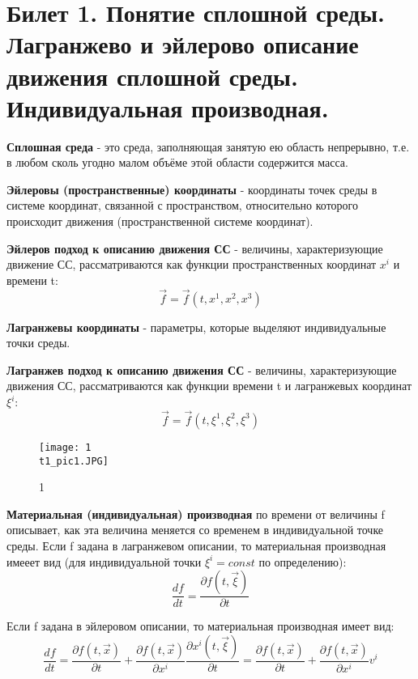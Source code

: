 \newpage
\section{Билет 1. Понятие сплошной среды. Лагранжево и эйлерово описание движения сплошной среды. Индивидуальная производная.}

\textbf{Сплошная среда} - это среда, заполняющая занятую ею область непрерывно, т.е. в любом сколь угодно малом объёме этой области содержится масса.

\textbf{Эйлеровы (пространственные) координаты} - координаты точек среды в системе координат, связанной с пространством, относительно которого происходит движения (пространственной системе координат).

\textbf{Эйлеров подход к описанию движения СС} - величины, характеризующие движение СС, рассматриваются как функции пространственных координат $x^i$ и времени t: $$\vec{f} = \vec{f}(t, x^1, x^2, x^3)$$

\textbf{Лагранжевы координаты} - параметры, которые выделяют индивидуальные точки среды.

\textbf{Лагранжев подход к описанию движения СС} - величины, характеризующие движения СС, рассматриваются как функции времени t и лагранжевых координат $\xi^i$: $$\vec{f} = \vec{f}(t, \xi^1, \xi^2, \xi^3)$$
\begin{figure}{}
\texttt{[image: 1\\t1\_pic1.JPG]}
\caption{\label{ris:image2}1}
\end{figure}

\textbf{Материальная (индивидуальная) производная} по времени от величины f описывает, как эта величина меняется со временем в индивидуальной точке среды. Если f задана в лагранжевом описании, то материальная производная имееет вид (для индивидуальной точки $\xi^i = const $ по определению): $$\frac{df}{dt} = \frac{\partial f(t,\vec{\xi})}{\partial t}$$

Если f задана в эйлеровом описании, то материальная производная имеет вид: $$\frac{df}{dt} = \frac{\partial f(t,\vec{x})}{\partial t} + \frac{\partial f(t, \vec{x})}{\partial x^i}\frac{\partial x^i(t,\vec{\xi})}{\partial t} = \frac{\partial f(t,\vec{x})}{\partial t} + \frac{\partial f(t, \vec{x})}{\partial x^i}v^i$$
